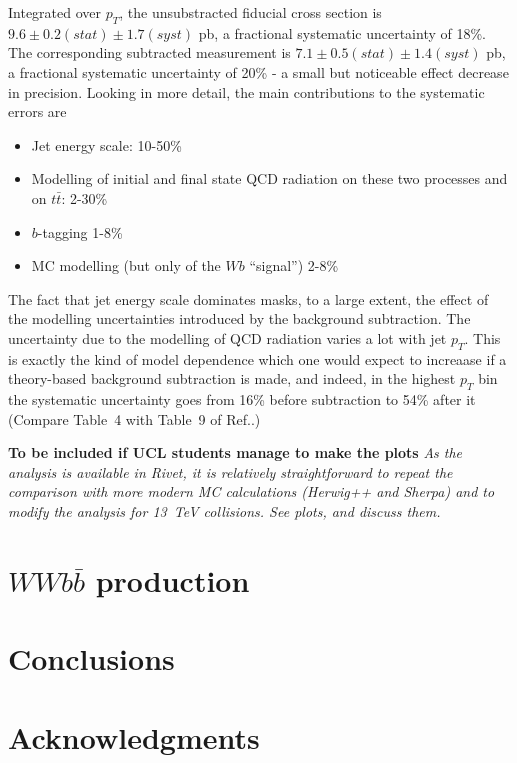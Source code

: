 \documentclass[floatfix]{article}
\begin{document}
Integrated over $p_T$, the unsubstracted fiducial cross section is
$9.6 \pm 0.2 (stat) \pm 1.7 (syst)$ pb, a fractional systematic uncertainty of 18\%.
The corresponding subtracted measurement is 
$7.1 \pm 0.5 (stat) \pm 1.4 (syst)$ pb, a fractional systematic uncertainty of 20\%
- a small but noticeable effect decrease in precision. Looking in more detail, the main contributions 
to the systematic errors are
\begin{itemize}
\item Jet energy scale: 10-50\%
\item Modelling of initial and final state QCD radiation on these two processes and on $t\bar{t}$: 2-30\%
\item $b$-tagging 1-8\%
\item MC modelling (but only of the $Wb$ “signal”) 2-8\%
\end{itemize}
The fact that jet energy scale dominates masks, to a large extent, the effect of the modelling uncertainties introduced by
the background subtraction.
The uncertainty due to the modelling of QCD radiation varies a lot with jet $p_T$. 
This is exactly the kind of model dependence which one would expect to increaase if a theory-based background
subtraction is made, and indeed, in the highest $p_T$ bin the systematic uncertainty goes from 16\% before subtraction 
to 54\% after it (Compare Table~4 with Table~9 of Ref.\cite{Aad:2013vka}.) 

{\bf To be included if UCL students manage to make the plots}
{\it As the analysis is available in Rivet, it is relatively straightforward to repeat the comparison
with more modern MC calculations (Herwig++ and Sherpa) and to modify the analysis for 13~TeV collisions.
See plots, and discuss them.}

\section{$WWb\bar{b}$ production}

\section{Conclusions}\label{sec:conclusions}

\section*{Acknowledgments}




\end{document}
